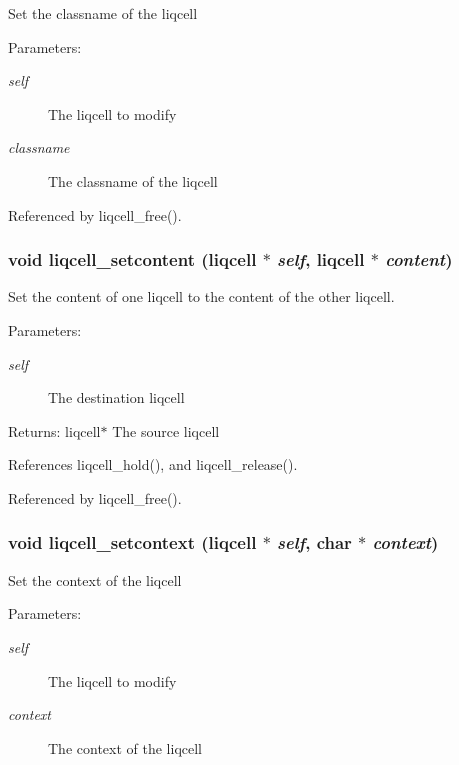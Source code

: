 Set the classname of the liqcell \begin{Desc}
\item[Parameters:]
\begin{description}
\item[{\em self}]The liqcell to modify \item[{\em classname}]The classname of the liqcell \end{description}
\end{Desc}


Referenced by liqcell\_\-free().
\subsubsection[{liqcell\_\-setcontent}]{\setlength{\rightskip}{0pt plus 5cm}void liqcell\_\-setcontent (liqcell $\ast$ {\em self}, \/  liqcell $\ast$ {\em content})}\label{d5/da2/liqcell_8c_87311189daa852e6b7c02d3fb507dc00}


Set the content of one liqcell to the content of the other liqcell. \begin{Desc}
\item[Parameters:]
\begin{description}
\item[{\em self}]The destination liqcell \end{description}
\end{Desc}
\begin{Desc}
\item[Returns:]liqcell$\ast$ The source liqcell \end{Desc}


References liqcell\_\-hold(), and liqcell\_\-release().

Referenced by liqcell\_\-free().
\subsubsection[{liqcell\_\-setcontext}]{\setlength{\rightskip}{0pt plus 5cm}void liqcell\_\-setcontext (liqcell $\ast$ {\em self}, \/  char $\ast$ {\em context})}\label{d5/da2/liqcell_8c_ceb981921f6ccaa806687a5bdd66f06a}


Set the context of the liqcell \begin{Desc}
\item[Parameters:]
\begin{description}
\item[{\em self}]The liqcell to modify \item[{\em context}]The context of the liqcell \end{description}
\end{Desc}


